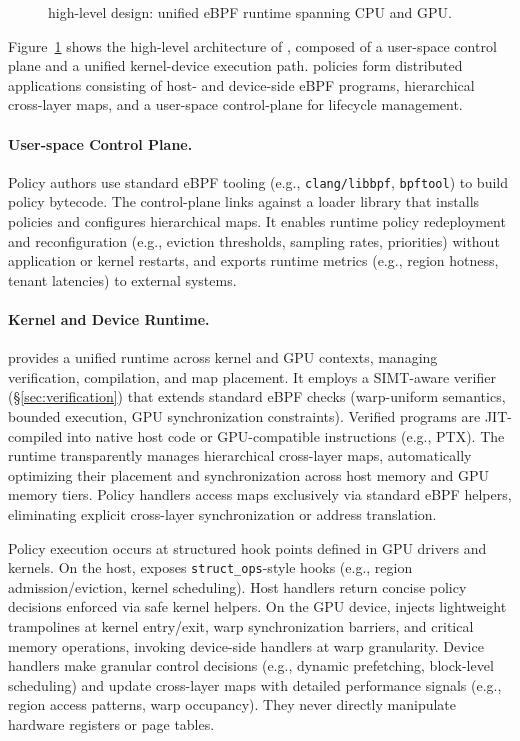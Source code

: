 \begin{figure}
\centering
{}
\vspace{-.5ex}
\caption{\sys high-level design: unified eBPF runtime spanning CPU and GPU.}
\label{fig:system-design}
\end{figure}

Figure~\ref{fig:system-design} shows the high-level architecture of \sys, composed of a user-space control plane and a unified kernel-device execution path. \sys policies form distributed applications consisting of host- and device-side eBPF programs, hierarchical cross-layer maps, and a user-space control-plane for lifecycle management.

\paragraph{User-space Control Plane.}
Policy authors use standard eBPF tooling (e.g., \texttt{clang/libbpf}, \texttt{bpftool}) to build policy bytecode. The control-plane links against a loader library that installs policies and configures hierarchical maps. It enables runtime policy redeployment and reconfiguration (e.g., eviction thresholds, sampling rates, priorities) without application or kernel restarts, and exports runtime metrics (e.g., region hotness, tenant latencies) to external systems.

\paragraph{Kernel and Device Runtime.}
\sys provides a unified runtime across kernel and GPU contexts, managing verification, compilation, and map placement. It employs a SIMT-aware verifier (\S\ref{sec:verification}) that extends standard eBPF checks (warp-uniform semantics, bounded execution, GPU synchronization constraints). Verified programs are JIT-compiled into native host code or GPU-compatible instructions (e.g., PTX). The runtime transparently manages hierarchical cross-layer maps, automatically optimizing their placement and synchronization across host memory and GPU memory tiers. Policy handlers access maps exclusively via standard eBPF helpers, eliminating explicit cross-layer synchronization or address translation.

Policy execution occurs at structured hook points defined in GPU drivers and kernels. On the host, \sysdriver exposes \texttt{struct\_ops}-style hooks (e.g., region admission/eviction, kernel scheduling). Host handlers return concise policy decisions enforced via safe kernel helpers. On the GPU device, \sys injects lightweight trampolines at kernel entry/exit, warp synchronization barriers, and critical memory operations, invoking device-side handlers at warp granularity. Device handlers make granular control decisions (e.g., dynamic prefetching, block-level scheduling) and update cross-layer maps with detailed performance signals (e.g., region access patterns, warp occupancy). They never directly manipulate hardware registers or page tables.

